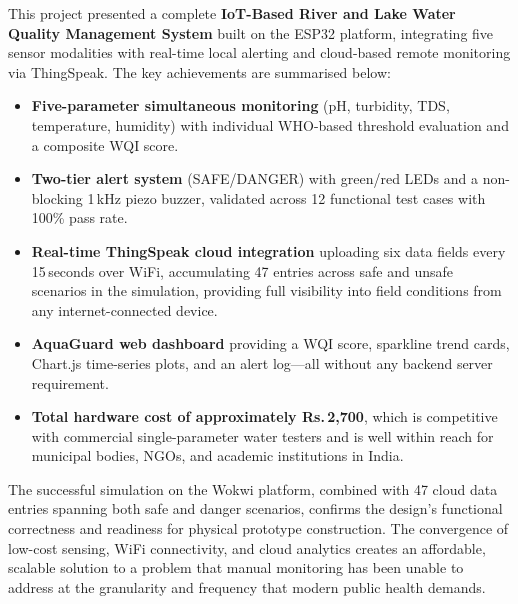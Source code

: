 \documentclass[12pt,a4paper]{article}
\begin{document}
This project presented a complete \textbf{IoT-Based River and
Lake Water Quality Management System} built on the ESP32
platform, integrating five sensor modalities with real-time
local alerting and cloud-based remote monitoring via ThingSpeak.
The key achievements are summarised below:

\begin{itemize}[leftmargin=2em, itemsep=4pt]
  \item \textbf{Five-parameter simultaneous monitoring} (pH,
        turbidity, TDS, temperature, humidity) with individual
        WHO-based threshold evaluation and a composite WQI score.
  \item \textbf{Two-tier alert system} (SAFE/DANGER) with green/red
        LEDs and a non-blocking 1\,kHz piezo buzzer, validated
        across 12 functional test cases with 100\% pass rate.
  \item \textbf{Real-time ThingSpeak cloud integration} uploading
        six data fields every 15\,seconds over WiFi, accumulating
        47 entries across safe and unsafe scenarios in the
        simulation, providing full visibility into field conditions
        from any internet-connected device.
  \item \textbf{AquaGuard web dashboard} providing a WQI score,
        sparkline trend cards, Chart.js time-series plots, and an
        alert log---all without any backend server requirement.
  \item \textbf{Total hardware cost of approximately Rs.\,2,700},
        which is competitive with commercial single-parameter
        water testers and is well within reach for municipal
        bodies, NGOs, and academic institutions in India.
\end{itemize}

The successful simulation on the Wokwi platform, combined with
47 cloud data entries spanning both safe and danger scenarios,
confirms the design's functional correctness and readiness for
physical prototype construction. The convergence of low-cost sensing,
WiFi connectivity, and cloud analytics creates an affordable,
scalable solution to a problem that manual monitoring has been
unable to address at the granularity and frequency that modern
public health demands.
\end{document}
